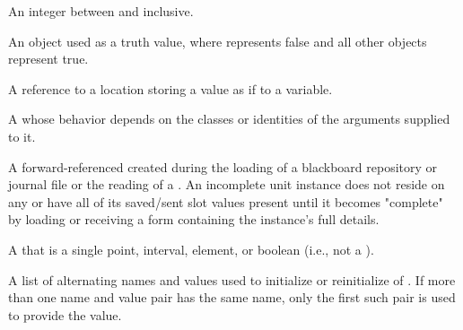 \begin{glossary-list}

\glent[fixnum]
%
%
%
An integer between  and
 inclusive.


%
%
%
%
An object used as a truth value, where \nil{} represents false and all other
objects represent true.


%
%
%
A reference to a location storing a value as if to a variable.


%
%
A  whose behavior depends on the classes or identities of the
arguments supplied to it.


%
%
%
%
A forward-referenced  created during the loading of a
blackboard repository or journal file or the reading of a
.  An incomplete unit instance does not reside on any
 or have all of its saved/sent slot values present until
it becomes "complete" by loading or receiving a form containing the instance's
full details.


%
%
%
A  that is a single point, interval, element, or
boolean (i.e., not a ).


%
%
%
%
A list of alternating names and values used to initialize or reinitialize
 of .  If more than one name and value pair
has the same name, only the first such pair is used to provide the value.


\end{glossary-list}
